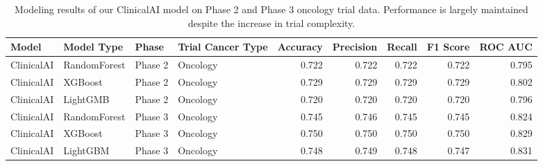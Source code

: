 \begin{table}
\caption{Modeling results of our ClinicalAI model on Phase 2 and Phase 3 oncology trial data. Performance is largely maintained despite the increase in trial complexity.}
\label{tab:model_performance}
\begin{tabular}{llllrrrrr}
\toprule
Model & Model Type & Phase & Trial Cancer Type & Accuracy & Precision & Recall & F1 Score & ROC AUC \\
\midrule
ClinicalAI & RandomForest & Phase 2 & Oncology & 0.722 & 0.722 & 0.722 & 0.722 & 0.795 \\
ClinicalAI & XGBoost & Phase 2 & Oncology & 0.729 & 0.729 & 0.729 & 0.729 & 0.802 \\
ClinicalAI & LightGMB & Phase 2 & Oncology & 0.720 & 0.720 & 0.720 & 0.720 & 0.796 \\
ClinicalAI & RandomForest & Phase 3 & Oncology & 0.745 & 0.746 & 0.745 & 0.745 & 0.824 \\
ClinicalAI & XGBoost & Phase 3 & Oncology & 0.750 & 0.750 & 0.750 & 0.750 & 0.829 \\
ClinicalAI & LightGBM & Phase 3 & Oncology & 0.748 & 0.749 & 0.748 & 0.747 & 0.831 \\
\bottomrule
\end{tabular}
\end{table}
